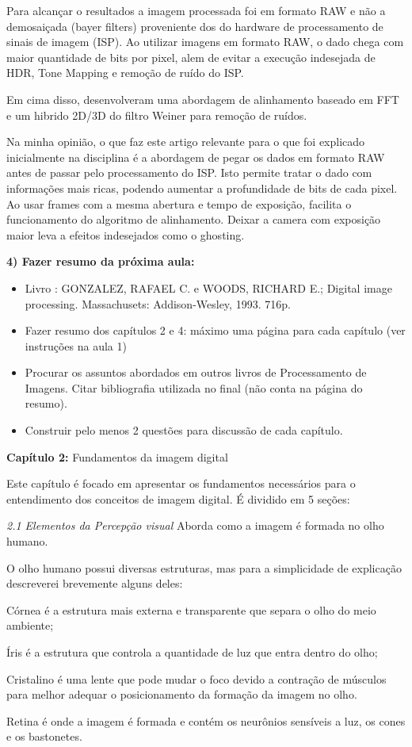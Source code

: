 \documentclass[a4paper]{sbgames}               %
\begin{document}
Para alcançar o resultados a imagem processada foi em formato RAW e não a demosaiçada (bayer filters) proveniente dos do hardware de processamento de sinais de imagem (ISP). Ao utilizar imagens em formato RAW, o dado chega com maior quantidade de bits por pixel, alem de evitar a execução indesejada de HDR, Tone Mapping e remoção de ruído do ISP.

Em cima disso, desenvolveram uma abordagem de alinhamento baseado em FFT e um hibrido 2D/3D do filtro Weiner para remoção de ruídos.

Na minha opinião, o que faz este artigo relevante para o que foi explicado inicialmente na disciplina é a abordagem de pegar os dados em formato RAW antes de passar pelo processamento do ISP. Isto permite tratar o dado com informações mais ricas, podendo aumentar a profundidade de bits de cada pixel. Ao usar frames com a mesma abertura e tempo de exposição, facilita o funcionamento do algoritmo de alinhamento. Deixar a camera com exposição maior leva a efeitos indesejados como o ghosting.

\textbf{4) Fazer resumo da próxima aula:}
\begin{itemize}
\item Livro : GONZALEZ, RAFAEL C. e WOODS, RICHARD E.; Digital image processing. Massachusets: Addison-Wesley, 1993. 716p. \cite{Gonzalez02a}
\item Fazer resumo dos capítulos 2 e 4: máximo uma página para cada capítulo (ver instruções na aula 1)
\item Procurar os assuntos abordados em outros livros de Processamento de Imagens. Citar bibliografia utilizada no final (não conta na página do resumo).
\item Construir pelo menos 2 questões para discussão de cada capítulo.
\end{itemize}

\pagebreak

\textbf{Capítulo 2:} Fundamentos da imagem digital

Este capítulo é focado em apresentar os fundamentos necessários para o entendimento dos conceitos de imagem digital. É dividido em 5 seções:

\textit{2.1 Elementos da Percepção visual} Aborda como a imagem é formada no olho humano. 

O olho humano possui diversas estruturas, mas para a simplicidade de explicação descreverei brevemente alguns deles:

\begin{description}
\item{Córnea} é a estrutura mais externa e transparente que separa o olho do meio ambiente;
\item{Íris} é a estrutura que controla a quantidade de luz que entra dentro do olho;
\item{Cristalino} é uma lente que pode mudar o foco devido a contração de músculos para melhor adequar o posicionamento da formação da imagem no olho.
\item{Retina} é onde a imagem é formada e contém os neurônios sensíveis a luz, os cones e os bastonetes. 
\end{description}
\end{document}
